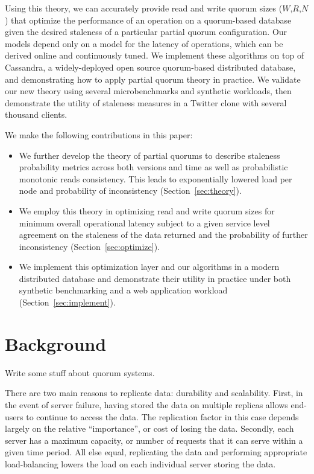 \documentclass{vldb}
\begin{document}
Using this theory, we can accurately provide read and write quorum
sizes ($W$,$R$,$N$) that optimize the performance of an operation on a
quorum-based database given the desired staleness of a particular
partial quorum configuration.  Our models depend only on a model for
the latency of operations, which can be derived online and
continuously tuned.  We implement these algorithms on top of
Cassandra, a widely-deployed open source quorum-based distributed
database, and demonstrating how to apply partial quorum theory in
practice.  We validate our new theory using several microbenchmarks
and synthetic workloads, then demonstrate the utility of staleness
measures in a Twitter clone with several thousand clients.

We make the following contributions in this paper:

\begin{itemize}

\item We further develop the theory of partial quorums to describe
  staleness probability metrics across both versions and time as well
  as probabilistic monotonic reads consistency.  This leads to
  exponentially lowered load per node and probability of
  inconsistency (Section~\ref{sec:theory}).

\item We employ this theory in optimizing read and write quorum sizes
  for minimum overall operational latency subject to a given
  service level agreement on the staleness of the data returned and
  the probability of further inconsistency (Section~\ref{sec:optimize}).

\item We implement this optimization layer and our algorithms in a
  modern distributed database and demonstrate their utility in
  practice under both synthetic benchmarking and a web application
  workload (Section~\ref{sec:implement}).

\end{itemize}

\section{Background}

Write some stuff about quorum systems.


There are two main reasons to replicate data: durability and
scalability.  First, in the event of server failure, having stored the
data on multiple replicas allows end-users to continue to access the
data.  The replication factor in this case depends largely on the
relative ``importance'', or cost of losing the data.  Secondly, each
server has a maximum capacity, or number of requests that it can serve within a
given time period.  All else equal, replicating the data and
performing appropriate load-balancing lowers the load on each
individual server storing the data.
\end{document}
